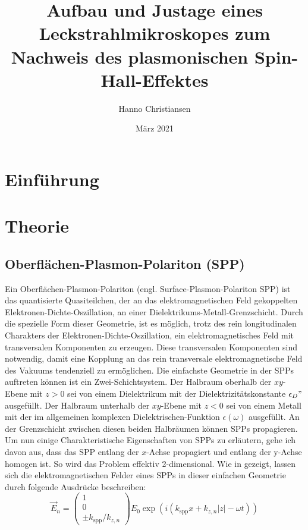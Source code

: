 \documentclass{article}
\title{Aufbau und Justage eines Leckstrahlmikroskopes zum Nachweis des plasmonischen Spin-Hall-Effektes}
\author{Hanno Christiansen}
\date{März 2021}
\begin{document}
	
\maketitle
\tableofcontents

\section{Einführung}
\section{Theorie}
	\subsection{Oberflächen-Plasmon-Polariton (SPP)}		
	Ein Oberflächen-Plasmon-Polariton (engl. Surface-Plasmon-Polariton SPP) ist das quantisierte Quasiteilchen, der an das elektromagnetischen Feld gekoppelten Elektronen-Dichte-Oszillation, an einer Dielektrikums-Metall-Grenzschicht. Durch die spezielle Form dieser Geometrie, ist es möglich, trotz des rein longitudinalen Charakters der Elektronen-Dichte-Oszillation, ein elektromagnetisches Feld mit transversalen Komponenten zu erzeugen. Diese transversalen Komponenten sind notwendig, damit eine Kopplung an das rein transversale elektromagnetische Feld des Vakuums tendenziell zu ermöglichen. Die einfachste Geometrie in der SPPs auftreten können ist ein Zwei-Schichtsystem. Der Halbraum oberhalb der $xy$-Ebene mit $z>0$ sei von einem Dielektrikum mit der Dielektrizitätskonstante $\epsilon_D"$ ausgefüllt. Der Halbraum unterhalb der $xy$-Ebene mit $z<0$ sei von einem Metall mit der im allgemeinen komplexen Dielektrischen-Funktion $\epsilon(\omega)$ ausgefüllt. An der Grenzschicht zwischen diesen beiden Halbräumen können SPPs propagieren. Um nun einige Charakteristische Eigenschaften von SPPs zu erläutern, gehe ich davon aus, dass das SPP entlang der $x$-Achse propagiert und entlang der y-Achse homogen ist. So wird das Problem effektiv 2-dimensional. Wie in \cite{Maier.2007} gezeigt, lassen sich die elektromagnetischen Felder eines SPPs in dieser einfachen Geometrie durch folgende Ausdrücke beschreiben:
	\begin{equation}
		\label{eq:electric_field_spp}
		\vec{E}_n = \begin{pmatrix} 1 \\ 0 \\ \pm k_{\mathrm{spp}}/k_{z,n} \end{pmatrix} E_0 \exp\left(i(k_{\mathrm{spp}}x + k_{z, n}|z|-\omega t)\right)	
	\end{equation}
\end{document}
